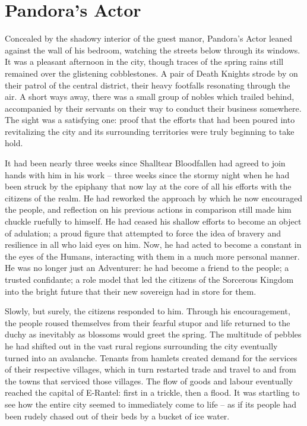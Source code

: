 \chapter{Pandora’s Actor}

Concealed by the shadowy interior of the guest manor, Pandora’s Actor leaned against the wall of his bedroom, watching the streets below through its windows. It was a pleasant afternoon in the city, though traces of the spring rains still remained over the glistening cobblestones. A pair of Death Knights strode by on their patrol of the central district, their heavy footfalls resonating through the air. A short ways away, there was a small group of nobles which trailed behind, accompanied by their servants on their way to conduct their business somewhere. The sight was a satisfying one: proof that the efforts that had been poured into revitalizing the city and its surrounding territories were truly beginning to take hold.

 

It had been nearly three weeks since Shalltear Bloodfallen had agreed to join hands with him in his work – three weeks since the stormy night when he had been struck by the epiphany that now lay at the core of all his efforts with the citizens of the realm. He had reworked the approach by which he now encouraged the people, and reflection on his previous actions in comparison still made him chuckle ruefully to himself. He had ceased his shallow efforts to become an object of adulation; a proud figure that attempted to force the idea of bravery and resilience in all who laid eyes on him. Now, he had acted to become a constant in the eyes of the Humans, interacting with them in a much more personal manner. He was no longer just an Adventurer: he had become a friend to the people; a trusted confidante; a role model that led the citizens of the Sorcerous Kingdom into the bright future that their new sovereign had in store for them.

 

Slowly, but surely, the citizens responded to him. Through his encouragement, the people roused themselves from their fearful stupor and life returned to the duchy as inevitably as blossoms would greet the spring. The multitude of pebbles he had shifted out in the vast rural regions surrounding the city eventually turned into an avalanche. Tenants from hamlets created demand for the services of their respective villages, which in turn restarted trade and travel to and from the towns that serviced those villages. The flow of goods and labour eventually reached the capital of E-Rantel: first in a trickle, then a flood. It was startling to see how the entire city seemed to immediately come to life – as if its people had been rudely chased out of their beds by a bucket of ice water.

